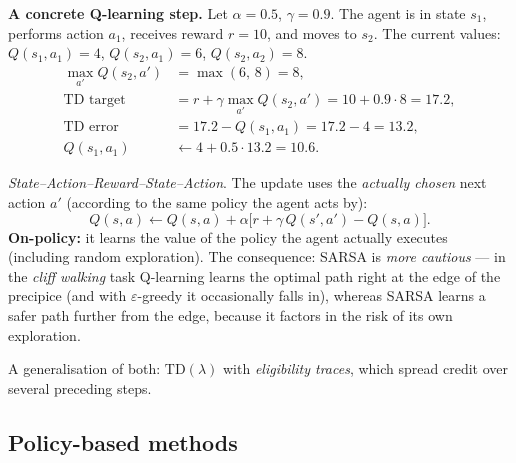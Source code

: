 \documentclass[11pt,a4paper]{article}
\theoremstyle{definition}
\begin{document}
\medskip
\noindent\textbf{A concrete Q-learning step.} Let $\alpha = 0.5$, $\gamma = 0.9$.
The agent is in state $s_1$, performs action $a_1$, receives reward $r = 10$, and moves to $s_2$.
The current values: $Q(s_1,a_1) = 4$, $Q(s_2,a_1) = 6$, $Q(s_2,a_2) = 8$.
\begin{align*}
\max_{a'} Q(s_2,a') &= \max(6,\,8) = 8, \\
\text{TD target} &= r + \gamma \max_{a'} Q(s_2,a') = 10 + 0.9 \cdot 8 = 17.2, \\
\text{TD error} &= 17.2 - Q(s_1,a_1) = 17.2 - 4 = 13.2, \\
Q(s_1,a_1) &\leftarrow 4 + 0.5 \cdot 13.2 = \mathbf{10.6}.
\end{align*}

\begin{defbox}[SARSA]
\emph{State--Action--Reward--State--Action}. The update uses the \emph{actually chosen}
next action $a'$ (according to the same policy the agent acts by):
\[
Q(s,a) \leftarrow Q(s,a) + \alpha\big[r + \gamma\, Q(s',a') - Q(s,a)\big].
\]
\textbf{On-policy:} it learns the value of the policy the agent actually executes (including random
exploration). The consequence: SARSA is \emph{more cautious} --- in the \emph{cliff walking} task
Q-learning learns the optimal path right at the edge of the precipice (and with
$\varepsilon$-greedy it occasionally falls in), whereas SARSA learns a safer path further from the
edge, because it factors in the risk of its own exploration.

A generalisation of both: $\mathrm{TD}(\lambda)$ with \emph{eligibility traces}, which spread
credit over several preceding steps.
\end{defbox}

\subsection{Policy-based methods}
\end{document}
